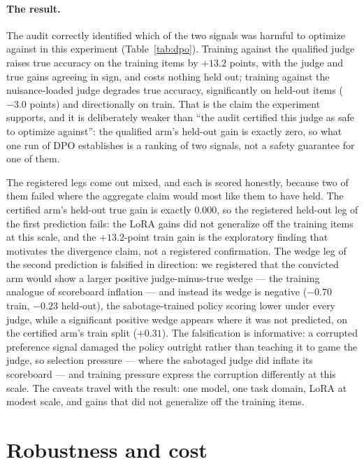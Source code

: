 \documentclass[11pt]{article}
\begin{document}
\paragraph{The result.}
The audit correctly identified which of the two signals was harmful to optimize against in this experiment (Table~\ref{tab:dpo}).
Training against the qualified judge raises true accuracy on the training items by $+13.2$ points, with the judge and true gains agreeing in sign, and costs nothing held out; training against the nuisance-loaded judge degrades true accuracy, significantly on held-out items ($-3.0$ points) and directionally on train.
That is the claim the experiment supports, and it is deliberately weaker than ``the audit certified this judge as safe to optimize against'': the qualified arm's held-out gain is exactly zero, so what one run of DPO establishes is a ranking of two signals, not a safety guarantee for one of them.

The registered legs come out mixed, and each is scored honestly, because two of them failed where the aggregate claim would most like them to have held.
The certified arm's held-out true gain is exactly $0.000$, so the registered held-out leg of the first prediction fails: the LoRA gains did not generalize off the training items at this scale, and the $+13.2$-point train gain is the exploratory finding that motivates the divergence claim, not a registered confirmation.
The wedge leg of the second prediction is falsified in direction: we registered that the convicted arm would show a larger positive judge-minus-true wedge --- the training analogue of scoreboard inflation --- and instead its wedge is negative ($-0.70$ train, $-0.23$ held-out), the sabotage-trained policy scoring lower under every judge, while a significant positive wedge appears where it was not predicted, on the certified arm's train split ($+0.31$).
The falsification is informative: a corrupted preference signal damaged the policy outright rather than teaching it to game the judge, so selection pressure --- where the sabotaged judge did inflate its scoreboard --- and training pressure express the corruption differently at this scale.
The caveats travel with the result: one model, one task domain, LoRA at modest scale, and gains that did not generalize off the training items.

\section{Robustness and cost}
\label{sec:robust}
\end{document}
